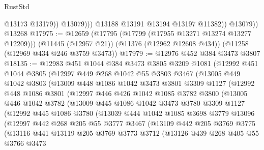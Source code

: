 \begin{lexlean}{RustStd}
\begin{coremodule}
{{{{{{{{{{{{{{{{{{{                      @13173
                      @13179))
                  @13079)))
            @13188
            @13191
            @13194
            @13197
            @11382))
        @13079))
    @13268
@17975 := @12659
    (@17795 (@17799 (@17955 @13271 @13274 @13277 @12209)))
    (@11445 (@12957 @21))
    (@11376 (@12962 @12608 @434))
    (@11258 (@12969 @434 @246 @3759 @3473))
@17979 := @12976 @452 @384 @3473 @3807
@18135 := @12983
    @451
    @1044
    @384
    @3473
    @3805
    @3209
    @1081
    (@12992
      @451
      @1044
      @3805
      (@12997
        @449
        @268
        @1042
        @55
        @3803
        @3467
        (@13005
          @449
          @1042
          @3803
          (@13009
            @448
            @1086
            @1042
            @3473
            @3801
            @3309
            @1127
            (@12992
              @448
              @1086
              @3801
              (@12997
                @446
                @426
                @1042
                @1085
                @3782
                @3800
                (@13005
                  @446
                  @1042
                  @3782
                  (@13009
                    @445
                    @1086
                    @1042
                    @3473
                    @3780
                    @3309
                    @1127
                    (@12992
                      @445
                      @1086
                      @3780
                      (@13039
                        @444
                        @1042
                        @1085
                        @3698
                        @3779
                        @13096
                        (@12997
                          @442
                          @268
                          @205
                          @55
                          @3777
                          @3467
                          (@13109
                            @442
                            @205
                            @3769
                            @3775
                            (@13116
                              @441
                              @13119
                              @205
                              @3769
                              @3773
                              @3712
                              (@13126
                                @439
                                @268
                                @405
                                @55
                                @3766
                                @3473
}}}}}}}}}}}}}}}}}}}
\end{coremodule}
\end{lexlean}
